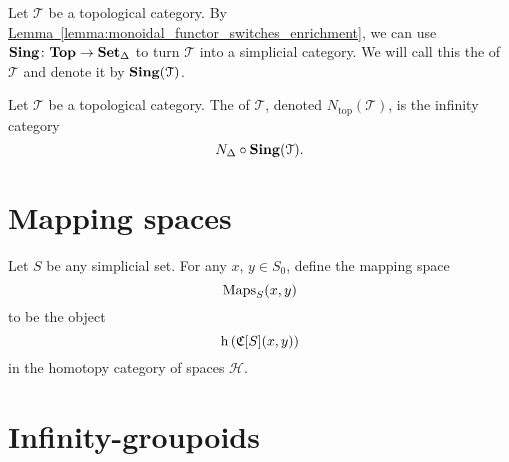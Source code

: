 \documentclass[main.tex]{subfiles}
\begin{document}

\begin{definition}
  \label{def:singular_nerve}
  Let $\mathcal{T}$ be a topological category. By \hyperref[lemma:monoidal_functor_switches_enrichment]{Lemma~\ref*{lemma:monoidal_functor_switches_enrichment}}, we can use $\mathbf{Sing}\colon \mathbf{Top} \to \operatorname{\mathbf{Set}_{\Delta}}$ to turn $\mathcal{T}$ into a simplicial category. We will call this the  of $\mathcal{T}$ and denote it by $\mathbf{Sing}(\mathcal{T})$.
\end{definition}

\begin{definition}
  \label{def:topological_nerve}
  Let $\mathcal{T}$ be a topological category. The  of $\mathcal{T}$, denoted $N_{\mathrm{top}}(\mathcal{T})$, is the infinity category
  \begin{equation*}
    N_{\Delta} \circ \mathbf{Sing}(\mathcal{T}).
  \end{equation*}
\end{definition}



\section{Mapping spaces}
\label{sec:mapping_spaces}

\begin{definition}
  \label{def:mapping_spaces_of_a_simplicial_set}
  Let $S$ be any simplicial set. For any $x$, $y \in S_{0}$, define the mapping space
  \begin{equation*}
    \operatorname{Maps}_{S}(x, y)
  \end{equation*}
  to be the object
  \begin{equation*}
    \mathrm{h} \left( \mathfrak{C}[S](x, y) \right)
  \end{equation*}
  in the homotopy category of spaces $\mathcal{H}$.
\end{definition}

\section{Infinity-groupoids}
\label{sec:infinity_groupoids}
\end{document}
